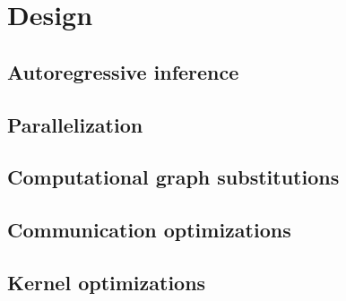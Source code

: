 \chapter{Design}
\section{Autoregressive inference}
\section{Parallelization}
\section{Computational graph substitutions}
\section{Communication optimizations}
\section{Kernel optimizations}
